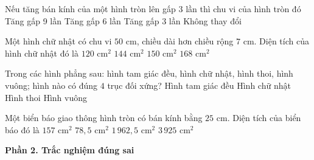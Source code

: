 \begin{ex} %
Nếu tăng bán kính của một hình tròn lên gấp 3 lần thì chu vi của hình tròn đó
\choice
{Tăng gấp 9 lần}
{Tăng gấp 6 lần}
{\True Tăng gấp 3 lần}
{Không thay đổi}
\end{ex}

\begin{ex} %
Một hình chữ nhật có chu vi $50\text{ cm}$, chiều dài hơn chiều rộng $7\text{ cm}$. Diện tích của hình chữ nhật đó là
\choice
{$120\text{ cm}^2$}
{\True $144\text{ cm}^2$}
{$150\text{ cm}^2$}
{$168\text{ cm}^2$}
\end{ex}

\begin{ex} %
Trong các hình phẳng sau: hình tam giác đều, hình chữ nhật, hình thoi, hình vuông; hình nào có đúng $4$ trục đối xứng?
\choice
{Hình tam giác đều}
{Hình chữ nhật}
{Hình thoi}
{\True Hình vuông}
\end{ex}

\begin{ex} %
Một biển báo giao thông hình tròn có bán kính bằng $25\text{ cm}$. Diện tích của biển báo đó là
\choice
{$157\text{ cm}^2$}
{$78{,}5\text{ cm}^2$}
{\True $1\,962{,}5\text{ cm}^2$}
{$3\,925\text{ cm}^2$}
\end{ex}

\textbf{Phần 2. Trắc nghiệm đúng sai}

